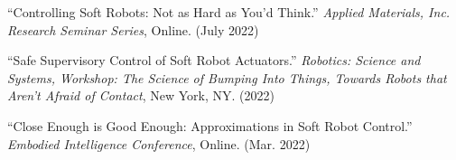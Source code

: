 \documentclass[letterpaper]{deedy-resume} %
\begin{document}
\begin{etaremune}[itemsep=0.1cm]
\item ``Controlling Soft Robots: Not as Hard as You'd Think.'' {\it Applied Materials, Inc. Research Seminar Series}, Online. (July 2022)

\item ``Safe Supervisory Control of Soft Robot Actuators.'' {\it Robotics: Science and Systems, Workshop: The Science of Bumping Into Things, Towards Robots that Aren't Afraid of Contact}, New York, NY. (2022)

\item ``Close Enough is Good Enough: Approximations in Soft Robot Control.'' {\it Embodied Intelligence Conference}, Online. (Mar. 2022)


 \end{etaremune}

\vspace{0.2cm}

{}
\end{document}
